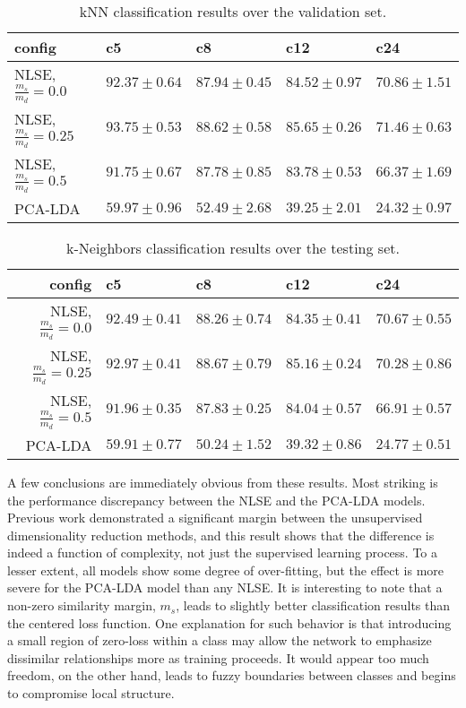 \begin{table*}[h!]
\begin{center}
\caption{kNN classification results over the validation set.}
\small
\begin{tabular}{lllll}
\hline
config & c5  & c8 & c12   & c24     \\
\hline
 NLSE, $\frac{m_s}{m_d}=0.0$  & $92.37\pm0.64$ & $87.94\pm0.45$ & $84.52\pm0.97$ & $70.86\pm1.51$ \\
 NLSE, $\frac{m_s}{m_d}=0.25$ & $93.75\pm0.53$ & $88.62\pm0.58$ & $85.65\pm0.26$ & $71.46\pm0.63$ \\
 NLSE, $\frac{m_s}{m_d}=0.5$  & $91.75\pm0.67$ & $87.78\pm0.85$ & $83.78\pm0.53$ & $66.37\pm1.69$ \\
 \hline
 PCA-LDA & $59.97\pm0.96$ & $52.49\pm2.68$ & $39.25\pm2.01$ & $24.32\pm0.97$ \\
\hline
\end{tabular}
\label{tab:valid}
\end{center}
\end{table*}

\begin{table*}[h!]
\begin{center}
\caption{k-Neighbors classification results over the testing set.}
\small
\begin{tabular}{rllll}
\hline
config & c5  & c8  & c12   & c24   \\
\hline
 NLSE, $\frac{m_s}{m_d}=0.0$  & $92.49\pm0.41$ & $88.26\pm0.74$ & $84.35\pm0.41$ & $70.67\pm0.55$ \\
 NLSE, $\frac{m_s}{m_d}=0.25$ & $92.97\pm0.41$ & $88.67\pm0.79$ & $85.16\pm0.24$ & $70.28\pm0.86$ \\
 NLSE, $\frac{m_s}{m_d}=0.5$  & $91.96\pm0.35$ & $87.83\pm0.25$ & $84.04\pm0.57$ & $66.91\pm0.57$ \\
 \hline
 PCA-LDA  & $59.91\pm0.77$ & $50.24\pm1.52$ & $39.32\pm0.86$ & $24.77\pm0.51$ \\
\hline
\end{tabular}
\label{tab:test}
\end{center}
\end{table*}


A few conclusions are immediately obvious from these results.
Most striking is the performance discrepancy between the NLSE and the PCA-LDA models.
Previous work demonstrated a significant margin between the unsupervised dimensionality reduction methods, and this result shows that the difference is indeed a function of complexity, not just the supervised learning process.
To a lesser extent, all models show some degree of over-fitting, but the effect is more severe for the PCA-LDA model than any NLSE.
It is interesting to note that a non-zero similarity margin, $m_s$, leads to slightly better classification results than the centered loss function.
One explanation for such behavior is that introducing a small region of zero-loss within a class may allow the network to emphasize dissimilar relationships more as training proceeds.
It would appear too much freedom, on the other hand, leads to fuzzy boundaries between classes and begins to compromise local structure.


